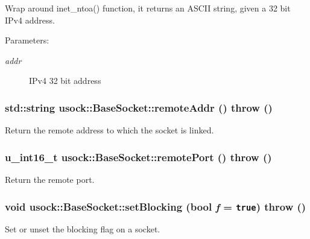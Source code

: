Wrap around inet\_\-ntoa() function, it returns an ASCII string, given a 32 bit IPv4 address. 

\begin{Desc}
\item[Parameters:]
\begin{description}
\item[{\em addr}]IPv4 32 bit address \end{description}
\end{Desc}
\hypertarget{classusock_1_1BaseSocket_3842fc1ea6ac5575e988d4ee620089a7}{
\subsubsection[{remoteAddr}]{\setlength{\rightskip}{0pt plus 5cm}std::string usock::BaseSocket::remoteAddr ()  throw ()}}
\label{classusock_1_1BaseSocket_3842fc1ea6ac5575e988d4ee620089a7}


Return the remote address to which the socket is linked. 

\hypertarget{classusock_1_1BaseSocket_e4e09d33779e097ada03144ff54286aa}{
\subsubsection[{remotePort}]{\setlength{\rightskip}{0pt plus 5cm}u\_\-int16\_\-t usock::BaseSocket::remotePort ()  throw ()}}
\label{classusock_1_1BaseSocket_e4e09d33779e097ada03144ff54286aa}


Return the remote port. 

\hypertarget{classusock_1_1BaseSocket_143722edec56e119495fb8ded76582e5}{
\subsubsection[{setBlocking}]{\setlength{\rightskip}{0pt plus 5cm}void usock::BaseSocket::setBlocking (bool {\em f} = {\tt true})  throw ()}}
\label{classusock_1_1BaseSocket_143722edec56e119495fb8ded76582e5}


Set or unset the blocking flag on a socket. 

